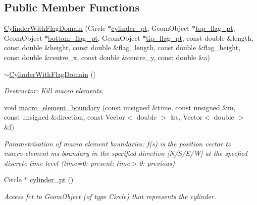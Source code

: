 \subsection*{Public Member Functions}
\begin{DoxyCompactItemize}
\item 
\hyperlink{classoomph_1_1CylinderWithFlagDomain_aa393d14243edaf8b8eaa02c9a01bd869}{Cylinder\+With\+Flag\+Domain} (Circle $\ast$\hyperlink{classoomph_1_1CylinderWithFlagDomain_a783f430b790953da4e01720be56d1872}{cylinder\+\_\+pt}, Geom\+Object $\ast$\hyperlink{classoomph_1_1CylinderWithFlagDomain_a268642db566b31b686ba8185e8610d8a}{top\+\_\+flag\+\_\+pt}, Geom\+Object $\ast$\hyperlink{classoomph_1_1CylinderWithFlagDomain_a4da493b4e9ddc3fc62f6beb269781e81}{bottom\+\_\+flag\+\_\+pt}, Geom\+Object $\ast$\hyperlink{classoomph_1_1CylinderWithFlagDomain_a9977cf9b4b71f83ba0f4d253164d4e00}{tip\+\_\+flag\+\_\+pt}, const double \&length, const double \&height, const double \&flag\+\_\+length, const double \&flag\+\_\+height, const double \&centre\+\_\+x, const double \&centre\+\_\+y, const double \&a)
\item 
\hyperlink{classoomph_1_1CylinderWithFlagDomain_a726928362d0d681f0420d1f088776e80}{$\sim$\+Cylinder\+With\+Flag\+Domain} ()
\begin{DoxyCompactList}\small\item\em Destructor\+: Kill macro elements. \end{DoxyCompactList}\item 
void \hyperlink{classoomph_1_1CylinderWithFlagDomain_a40bca9a30f1f874c043e68621b28de74}{macro\+\_\+element\+\_\+boundary} (const unsigned \&time, const unsigned \&m, const unsigned \&direction, const Vector$<$ double $>$ \&s, Vector$<$ double $>$ \&f)
\begin{DoxyCompactList}\small\item\em Parametrisation of macro element boundaries\+: f(s) is the position vector to macro-\/element m\textquotesingle{}s boundary in the specified direction \mbox{[}N/\+S/\+E/W\mbox{]} at the specfied discrete time level (time=0\+: present; time$>$0\+: previous) \end{DoxyCompactList}\item 
Circle $\ast$ \hyperlink{classoomph_1_1CylinderWithFlagDomain_a783f430b790953da4e01720be56d1872}{cylinder\+\_\+pt} ()
\begin{DoxyCompactList}\small\item\em Access fct to Geom\+Object (of type Circle) that represents the cylinder. \end{DoxyCompactList}\item 

\end{DoxyCompactItemize}
